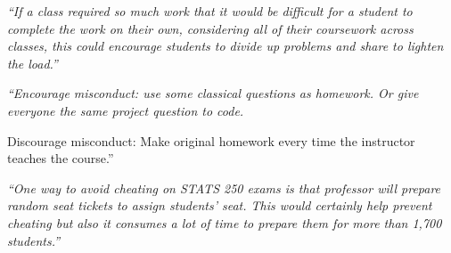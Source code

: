 \documentclass[12pt]{beamer}
\newcommand\ans[1]{{\it ``#1''}}
\newcommand\gap{\vspace{5mm}}
\begin{document}
\begin{frame}

  \ans{If a class required so much work that it would be difficult for a student to complete the  work  on  their  own,  considering  all  of  their  coursework  across  classes,  this  could encourage students to divide up problems and share to lighten the load.}

  \gap

  \ans{Encourage misconduct:  use some classical questions as homework.  Or give everyone the same project question to code.

    Discourage misconduct:  Make original homework every time the instructor teaches the course.}

  \gap

  \ans{One way to avoid cheating on STATS 250 exams is that professor will prepare random seat tickets to assign students’ seat.  This would certainly help prevent cheating but also it consumes a lot of time to prepare them for more than 1,700 students.}
  


\end{frame}
\end{document}
